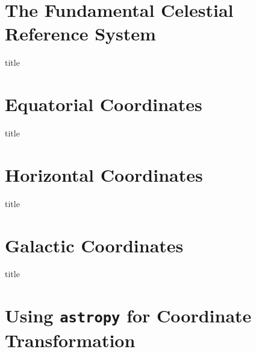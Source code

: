 \documentclass[aspectratio=1610, 9pt]{beamer}
\begin{document}
\section{The Fundamental Celestial Reference System}
\begin{frame}{title}
\end{frame}

\section{Equatorial Coordinates}
\begin{frame}{title}
\end{frame}

\section{Horizontal Coordinates}
\begin{frame}{title}
\end{frame}

\section{Galactic Coordinates}
\begin{frame}{title}
\end{frame}

\section{Using \texttt{astropy} for Coordinate Transformation}
\end{document}
